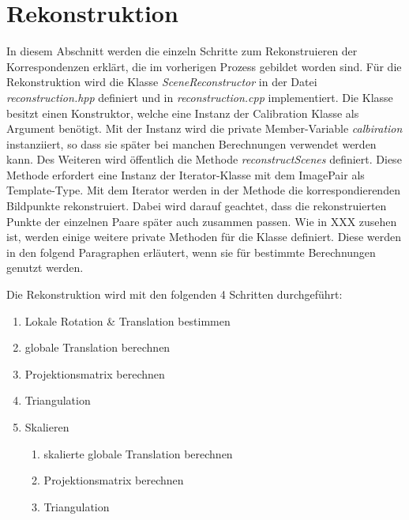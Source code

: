 \section{Rekonstruktion}


In diesem Abschnitt werden die einzeln Schritte zum Rekonstruieren der Korrespondenzen erklärt, die im vorherigen Prozess gebildet worden sind. 
Für die Rekonstruktion wird die Klasse \emph{SceneReconstructor} in der Datei \emph{reconstruction.hpp} definiert und in \emph{reconstruction.cpp} implementiert. 
Die Klasse besitzt einen Konstruktor, welche eine Instanz der Calibration Klasse als Argument benötigt. 
Mit der Instanz wird die private Member-Variable \emph{calbiration} instanziiert, so dass sie später bei manchen Berechnungen verwendet werden kann.
Des Weiteren wird öffentlich die Methode \emph{reconstructScenes} definiert.
Diese Methode erfordert eine Instanz der Iterator-Klasse mit dem ImagePair als Template-Type. %
Mit dem Iterator werden in der Methode die korrespondierenden Bildpunkte rekonstruiert.
Dabei wird darauf geachtet, dass die rekonstruierten Punkte der einzelnen Paare später auch zusammen passen.
Wie in XXX zusehen ist, werden einige weitere private Methoden für die Klasse definiert.
Diese werden in den folgend Paragraphen erläutert, wenn sie für bestimmte Berechnungen genutzt werden.

Die Rekonstruktion wird mit den folgenden 4 Schritten durchgeführt:

\begin{enumerate}
    \item Lokale Rotation \& Translation bestimmen
    \item globale Translation berechnen
    \item Projektionsmatrix berechnen
    \item Triangulation
    \item Skalieren
        \begin{enumerate}
            \item skalierte globale Translation berechnen
            \item Projektionsmatrix berechnen
            \item Triangulation
        \end{enumerate}
\end{enumerate}




